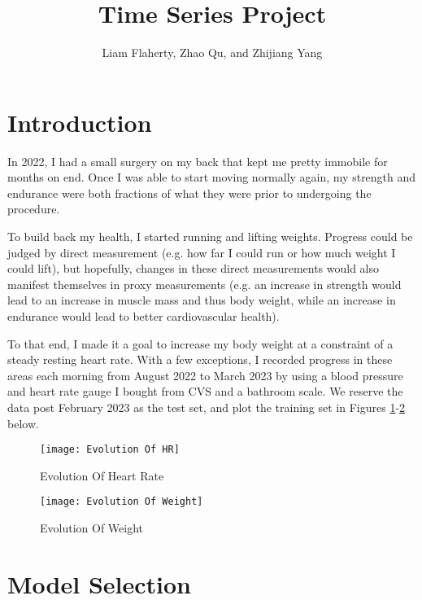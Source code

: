 \documentclass[12pt, letterpaper]{article}
\title{Time Series Project}
\author{Liam Flaherty, Zhao Qu, and Zhijiang Yang}
\date{\parbox{\linewidth}{\centering%
		Professor Martin\endgraf\bigskip
		NCSU: ST534-001\endgraf\bigskip
		October 14, 2024 \endgraf}}
\theoremstyle{definition}
\numberwithin{equation}{section}
\newcommand{\+}[1]{+_{\scalebox{.375}{#1}}}
\newcommand{\1}{\mathbbm{1}}
\begin{document}
\maketitle
\thispagestyle{empty}

\newpage\clearpage\noindent
\tableofcontents

\newpage
\section{Introduction}
\label{section.intro}

In 2022, I had a small surgery on my back that kept me pretty immobile for months on end. Once I was able to start moving normally again, my strength and endurance were both fractions of what they were prior to undergoing the procedure.
\vspace{\baselineskip}

To build back my health, I started running and lifting weights. Progress could be judged by direct measurement (e.g. how far I could run or how much weight I could lift), but hopefully, changes in these direct measurements would also manifest themselves in proxy measurements (e.g. an increase in strength would lead to an increase in muscle mass and thus body weight, while an increase in endurance would lead to better cardiovascular health).
\vspace{\baselineskip} 

To that end, I made it a goal to increase my body weight at a constraint of a steady resting heart rate. With a few exceptions, I recorded progress in these areas each morning from August 2022 to March 2023 by using a blood pressure and heart rate gauge I bought from CVS and a bathroom scale. We reserve the data post February 2023 as the test set, and plot the training set in Figures \ref{EvolutionOfHR}-\ref{EvolutionOfWeight} below.

\begin{figure}[H]
	\centering
	\texttt{[image: Evolution Of HR]}
	\caption{Evolution Of Heart Rate}
	\label{EvolutionOfHR}
\end{figure}

\begin{figure}[H]
	\centering
	\texttt{[image: Evolution Of Weight]}
	\caption{Evolution Of Weight}
	\label{EvolutionOfWeight}
\end{figure}






\newpage
\section{Model Selection}
\label{section.selection}
\end{document}
